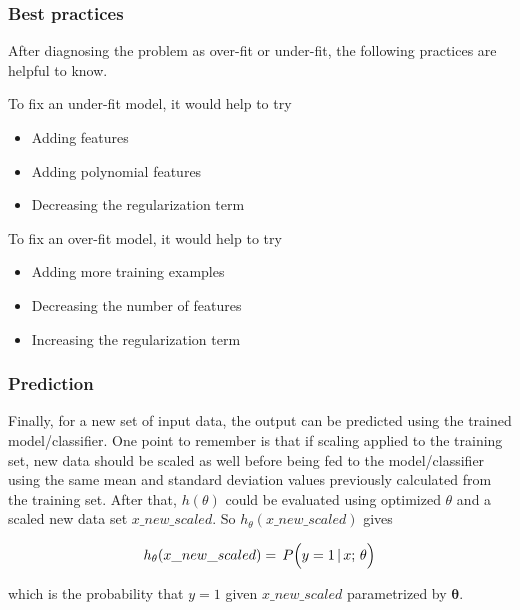 \subsubsection{Best practices}

After diagnosing the problem as over-fit or under-fit, the following practices are helpful to know. 

To fix an under-fit model, it would help to try 

\begin{itemize}

\item{Adding features}
\item{Adding polynomial features}
\item{Decreasing the regularization term}

\end{itemize}

To fix an over-fit model, it would help to try 

\begin{itemize}

\item{Adding more training examples}
\item{Decreasing the number of features}
\item{Increasing the regularization term}

\end{itemize}

\subsubsection{Prediction}

Finally, for a new set of input data, the output can be predicted using the trained model/classifier. 
One point to remember is that if scaling applied to the training set, new data should be scaled as well before being fed to the model/classifier using the same mean and standard deviation values previously calculated from the training set. 
After that, $h(\theta)$ could be evaluated using optimized $\theta$ and a scaled new data set $x\_new\_scaled$. 
So $h_\theta(x\_new\_scaled)$ gives

\begin{equation}{\label{eqn:prediction}
h_{\theta}(x\_new\_scaled})
=\,
P\Big(y=1 \, | \, x; \, \theta \Big)
\end{equation} 


which is the probability that $y = 1$ given $x\_new\_scaled$ parametrized by $\bm{\theta}$. 


